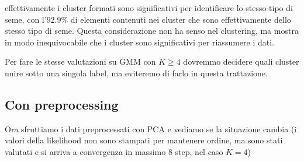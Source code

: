 \documentclass{report}
\begin{document}
    effettivamente i cluster formati sono significativi per identificare lo
stesso tipo di seme, con l'\(92.9\%\) di elementi contenuti nei cluster
che sono effettivamente dello stesso tipo di seme. Questa considerazione
non ha senso nel clustering, ma mostra in modo inequivocabile che i
cluster sono significativi per riassumere i dati.

Per fare le stesse valutazioni su GMM con \(K\geq4\) dovremmo decidere
quali cluster unire sotto una singola label, ma eviteremo di farlo in
questa trattazione.

\subsection{Con preprocessing}\label{con-preprocessing}

Ora sfruttiamo i dati preprocessati con PCA e vediamo se la situazione
cambia (i valori della likelihood non sono stampati per mantenere
ordine, ma sono stati valutati e si arriva a convergenza in massimo 8
step, nel caso \(K=4\))
\end{document}
